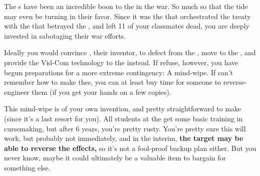 \documentclass[green]{GL2020}
\begin{document}
\name{\gMindWipe{}}

The \iVidCom{\MYname}s have been an incredible boon to the \pTech{} in the war. So much so that the tide may even be turning in their favor. Since it was the \pTech{} that orchestrated the treaty with the \pFarm{} that betrayed the \pShip{}, and left 11 of your classmates dead, you are deeply invested in sabotaging their war efforts.

Ideally you would convince \cTechStar{\full}, their inventor, to defect from the \pTech{}, move to the \pShip{}, and provide the Vid-Com technology to the \pShippies{} instead. If \cTechStar{\they} refuse, however, you have begun preparations for a more extreme contingency: A mind-wipe. If \cTechStar{} can’t remember how to make the\iVidCom{\MYname}s, you can at least buy time for someone to reverse-engineer them (if you get your hands on a few copies).

This mind-wipe is of your own invention, and pretty straightforward to make (since it’s a last resort for you). All students at the \pSchool{} get some basic training in cursemaking, but after 6 years, you’re pretty rusty. You’re pretty sure this will work, but probably not immediately, and in the interim, \textbf{the target may be able to reverse the effects,} so it’s not a fool-proof backup plan either. But you never know, maybe it could ultimately be a valuable item to bargain for something else.
\end{document}
